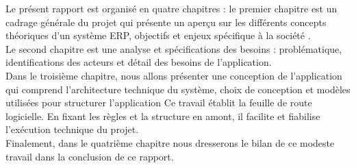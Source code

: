 Le présent rapport est organisé en quatre chapitres : 
le premier chapitre est un cadrage générale du projet qui présente un aperçu sur les différents concepts théoriques d’un système ERP, objectifs et enjeux spécifique à la société \reportEntreprise.\\
Le second chapitre est une analyse et spécifications des besoins : problématique, identifications des acteurs et détail des besoins de l’application.\\
Dans le troisième chapitre, nous allons présenter une conception de l’application qui comprend l’architecture technique du système, choix de conception et modèles utilisées pour structurer l’application Ce travail établit la feuille de route logicielle. En fixant les règles et la structure en amont, il facilite et fiabilise l'exécution technique du projet.\\
Finalement, dans le quatrième chapitre nous dresserons le bilan de ce modeste travail dans la conclusion de ce rapport.


